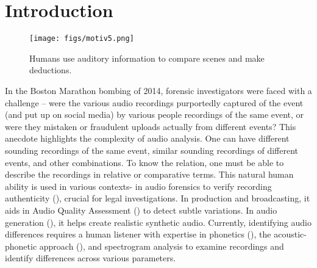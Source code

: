 \section{Introduction} \vspace{-0.1in}

\begin{wrapfigure}[17]{r}{0.40\textwidth}
\small
\begin{center}
     \vspace{-0.2in}
     \texttt{[image: figs/motiv5.png]}
     \caption{\small Humans use auditory information to compare scenes and make deductions.
     }
     \label{fig:motiv}
\end{center}
\end{wrapfigure}

In the Boston Marathon bombing of 2014, forensic investigators were faced with a challenge -- were the various audio recordings purportedly captured of the event (and put up on social media) by various people recordings of the same event, or were they mistaken or fraudulent uploads actually from different events? This anecdote highlights the complexity of audio analysis. One can have different sounding recordings of the same event, similar sounding recordings of different events, and other combinations. To know the relation, one must be able to describe the recordings in relative or comparative terms. This natural human ability is used in various contexts- in audio forensics to verify recording authenticity (\cite{af1,af2}), crucial for legal investigations. In production and broadcasting, it aids in Audio Quality Assessment (\cite{campbell2009audio, deshmukh2024pam}) to detect subtle variations. In audio generation (\cite{liu2023audioldm, kreukaudiogen}), it helps create realistic synthetic audio. Currently, identifying audio differences requires a human listener with expertise in phonetics (\cite{johnson2004acoustic}), the acoustic-phonetic approach (\cite{stevens2000acoustic}), and spectrogram analysis to examine recordings and identify differences across various parameters.

